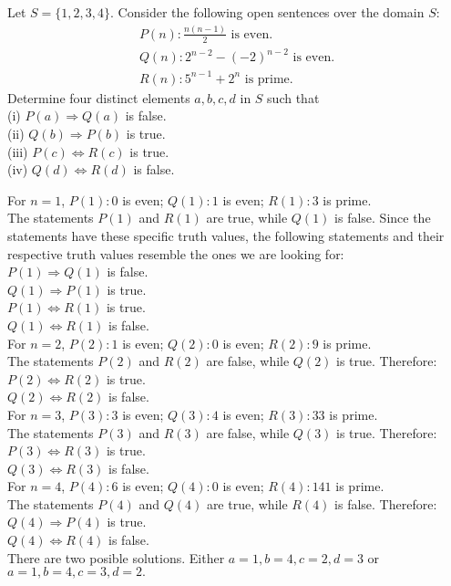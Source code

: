 \documentclass[12pt]{article}
\newenvironment{problem}[2][Problem]{\begin{trivlist}
		\item[\hskip \labelsep {\bfseries #1}\hskip \labelsep {\bfseries #2.}]}{\end{trivlist}}
\newenvironment{solution}[2][Solution]{\begin{trivlist}
		\item[\hskip \labelsep {\bfseries #1}\hskip \labelsep {\bfseries #2.}]}{\end{trivlist}}
\begin{document}
\begin{problem}{44}
	Let $S = \{1,2,3,4\}$. Consider the following open sentences over the domain $S$:
	\begin{align*}
		P(n): \frac{n(n-1)}{2} \text{ is even}.\\
		Q(n): 2^{n-2} - (-2)^{n-2} \text{ is even}.\\
		R(n): 5^{n-1} + 2^{n} \text{ is prime.}
	\end{align*}
	Determine four distinct elements $a,b,c,d$ in $S$ such that\\
	(i) $P(a) \Rightarrow Q(a)$ is false.\\
	(ii) $Q(b) \Rightarrow P(b)$ is true.\\
	(iii) $P(c) \Leftrightarrow R(c)$ is true.\\
	(iv) $Q(d) \Leftrightarrow R(d)$ is false.
	
	\begin{solution}{}
		For $n = 1$, $P(1):0$ is even; $Q(1): 1$ is even; $R(1): 3$ is prime.\\
		The statements $P(1)$ and $R(1)$ are true, while $Q(1)$ is false. Since the statements have these specific truth values, the following statements and their respective truth values resemble the ones we are looking for:\\
		$P(1)\Rightarrow Q(1)$ is false.\\
		$Q(1) \Rightarrow P(1)$ is true.\\
		$P(1) \Leftrightarrow R(1)$ is true.\\
		$Q(1) \Leftrightarrow R(1)$ is false.\\ 
		
		\noindent For $n = 2$, $P(2):1$ is even; $Q(2):0$ is even; $R(2):9$ is prime.\\
		The statements $P(2)$ and $R(2)$ are false, while $Q(2)$ is true. Therefore:\\
		$P(2) \Leftrightarrow R(2)$ is true.\\
		$Q(2) \Leftrightarrow R(2)$ is false.\\
		
		\noindent For $n = 3$, $P(3): 3$ is even; $Q(3): 4$ is even; $R(3): 33$ is prime.\\
		The statements $P(3)$ and $R(3)$ are false, while $Q(3)$ is true. Therefore:\\
		$P(3) \Leftrightarrow R(3)$ is true.\\
		$Q(3) \Leftrightarrow R(3)$ is false.\\
		
		\noindent For $n = 4$, $P(4):6$ is even; $Q(4):0$ is even; $R(4):141$ is prime.\\
		The statements $P(4)$ and $Q(4)$ are true, while $R(4)$ is false. Therefore:\\
		$Q(4) \Rightarrow P(4)$ is true.\\
		$Q(4) \Leftrightarrow R(4)$ is false.\\
		There are two posible solutions.
		Either $a = 1, b= 4, c = 2, d = 3$ or\\
		$a = 1, b = 4, c = 3, d = 2.$
	\end{solution}
\end{problem}
\end{document}
